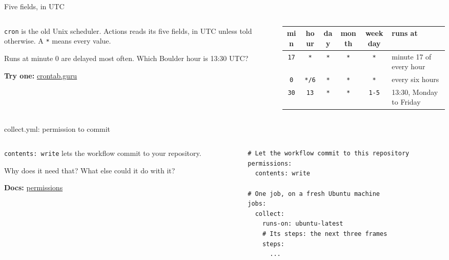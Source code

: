 \documentclass[9pt,aspectratio=169]{beamer}
\begin{document}
\begin{frame}{Five fields, in UTC}
    \begin{columns}[T]
        \begin{column}{0.37\textwidth}
            \texttt{cron} is the old Unix scheduler. Actions reads its five fields, in UTC unless told otherwise. A \texttt{*} means every value.

            \medskip
            Runs at minute 0 are delayed most often. Which Boulder hour is 13:30 UTC?

            \medskip
            {\scriptsize\textbf{Try one:} \href{https://crontab.guru}{crontab.guru}\par}
        \end{column}
        \begin{column}{0.6\textwidth}
            {\footnotesize
            \begin{tabular}{@{}cccccl@{}}
                \toprule
                min & hour & day & month & weekday & \textbf{runs at} \\
                \midrule
                \texttt{17} & \texttt{*} & \texttt{*} & \texttt{*} & \texttt{*} & minute 17 of every hour \\
                \texttt{0} & \texttt{*/6} & \texttt{*} & \texttt{*} & \texttt{*} & every six hours \\
                \texttt{30} & \texttt{13} & \texttt{*} & \texttt{*} & \texttt{1-5} & 13:30, Monday to Friday \\
                \bottomrule
            \end{tabular}\par}
        \end{column}
    \end{columns}
\end{frame}

\begin{frame}[fragile]{collect.yml: permission to commit}
    \begin{columns}[T]
        \begin{column}{0.37\textwidth}
            \texttt{contents: write} lets the workflow commit to your repository.

            \medskip
            Why does it need that? What else could it do with it?

            \medskip
            {\scriptsize\textbf{Docs:} \href{https://docs.github.com/en/actions/reference/workflows-and-actions/workflow-syntax\#permissions}{permissions}\par}
        \end{column}
        \begin{column}{0.6\textwidth}
\begin{lstlisting}[language={}]
# Let the workflow commit to this repository
permissions:
  contents: write

# One job, on a fresh Ubuntu machine
jobs:
  collect:
    runs-on: ubuntu-latest
    # Its steps: the next three frames
    steps:
      ...
\end{lstlisting}
        \end{column}
    \end{columns}
\end{frame}
\end{document}
